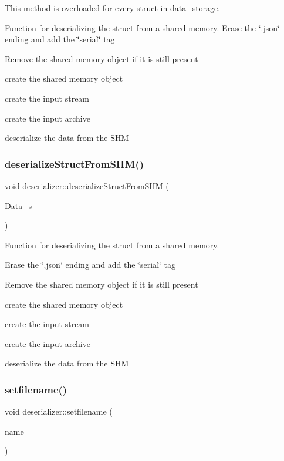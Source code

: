 This method is overloaded for every struct in data\+\_\+storage. 

Function for deserializing the struct from a shared memory. Erase the \char`\"{}.\+json\char`\"{} ending and add the \char`\"{}serial\char`\"{} tag

Remove the shared memory object if it is still present

create the shared memory object

create the input stream

create the input archive

deserialize the data from the S\+HM \mbox{\label{classdeserializer_a759537748db65f231bf04372efe3253c}} 
\subsubsection{\texorpdfstring{deserialize\+Struct\+From\+S\+H\+M()}{deserializeStructFromSHM()}\hspace{0.1cm}{\footnotesize\ttfamily [2/2]}}
{\footnotesize\ttfamily void deserializer\+::deserialize\+Struct\+From\+S\+HM (\begin{DoxyParamCaption}\item[{\hyperlink{structEXMPLE__s}{E\+X\+M\+P\+L\+E\+\_\+s} $\ast$}]{Data\+\_\+s }\end{DoxyParamCaption})}



Function for deserializing the struct from a shared memory. 

Erase the \char`\"{}.\+json\char`\"{} ending and add the \char`\"{}serial\char`\"{} tag

Remove the shared memory object if it is still present

create the shared memory object

create the input stream

create the input archive

deserialize the data from the S\+HM \mbox{\label{classdeserializer_a5d20cd8a970098ce2bb6473c2eccfddf}} 
\subsubsection{\texorpdfstring{setfilename()}{setfilename()}}
{\footnotesize\ttfamily void deserializer\+::setfilename (\begin{DoxyParamCaption}\item[{string}]{name }\end{DoxyParamCaption})}



